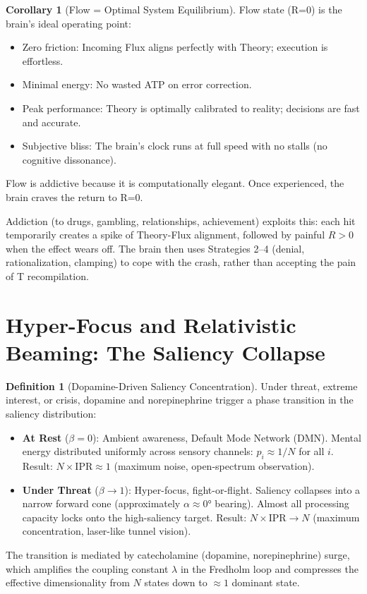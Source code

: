\documentclass[11pt,oneside]{article}
\theoremstyle{definition}
\newtheorem{corollary}[theorem]{Corollary}
\newtheorem{definition}[theorem]{Definition}
\begin{document}
\begin{corollary}[Flow = Optimal System Equilibrium]
Flow state (R=0) is the brain's ideal operating point:
\begin{itemize}
  \item Zero friction: Incoming Flux aligns perfectly with Theory; execution is effortless.
  \item Minimal energy: No wasted ATP on error correction.
  \item Peak performance: Theory is optimally calibrated to reality; decisions are fast and accurate.
  \item Subjective bliss: The brain's clock runs at full speed with no stalls (no cognitive dissonance).
\end{itemize}

Flow is addictive because it is computationally elegant. Once experienced, the brain craves the return to R=0.

Addiction (to drugs, gambling, relationships, achievement) exploits this: each hit temporarily creates a spike of Theory-Flux alignment, followed by painful $R > 0$ when the effect wears off. The brain then uses Strategies 2--4 (denial, rationalization, clamping) to cope with the crash, rather than accepting the pain of T recompilation.
\end{corollary}

\section{Hyper-Focus and Relativistic Beaming: The Saliency Collapse}

\begin{definition}[Dopamine-Driven Saliency Concentration]
Under threat, extreme interest, or crisis, dopamine and norepinephrine trigger a phase transition in the saliency distribution:

\begin{itemize}
  \item \textbf{At Rest} ($\beta = 0$): Ambient awareness, Default Mode Network (DMN). Mental energy distributed uniformly across sensory channels: $p_i \approx 1/N$ for all $i$. Result: $N \times \text{IPR} \approx 1$ (maximum noise, open-spectrum observation).

  \item \textbf{Under Threat} ($\beta \to 1$): Hyper-focus, fight-or-flight. Saliency collapses into a narrow forward cone (approximately $\alpha \approx 0°$ bearing). Almost all processing capacity locks onto the high-saliency target. Result: $N \times \text{IPR} \to N$ (maximum concentration, laser-like tunnel vision).
\end{itemize}

The transition is mediated by catecholamine (dopamine, norepinephrine) surge, which amplifies the coupling constant $\lambda$ in the Fredholm loop and compresses the effective dimensionality from $N$ states down to $\approx 1$ dominant state.
\end{definition}
\end{document}
